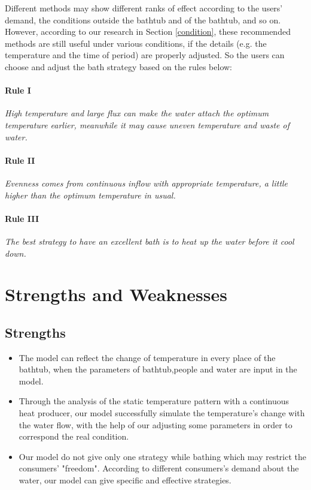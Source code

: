 \documentclass{HZNUMCM}
\begin{document}
Different methods may show different ranks of effect according to the users' demand, the conditions
outside the bathtub and of the bathtub, and so on. However, according to our research in Section
\ref{condition}, these recommended methods are still useful under various conditions, if the details
(e.g. the temperature and the time of period) are properly adjusted. So the users can choose and
adjust the bath strategy based on the rules below:

\paragraph{Rule I}
\emph{High temperature and large flux can make the water attach the optimum temperature earlier,
meanwhile it may cause uneven temperature and waste of water.}
\paragraph{Rule II}
\emph{Evenness comes from continuous inflow with appropriate temperature, a little higher than the
optimum temperature in usual.}
\paragraph{Rule III}
\emph{The best strategy to have an excellent bath is to heat up the water before it cool down.}

\section{Strengths and Weaknesses}
\subsection{Strengths}
\begin{itemize}
    \item The model can reflect the change of temperature in every place of the bathtub, when the
    parameters of bathtub,people and water are input in the model.
    \item Through the analysis of the static temperature pattern with a continuous heat producer,
    our model successfully simulate the temperature's change with the water flow, with the help of
    our adjusting some parameters in order to correspond the real condition.
    \item Our model do not give only one strategy while bathing which may restrict the consumers'
    "freedom". According to different consumers's demand about the water, our model can give
    specific and effective strategies.
\end{itemize}
\end{document}
